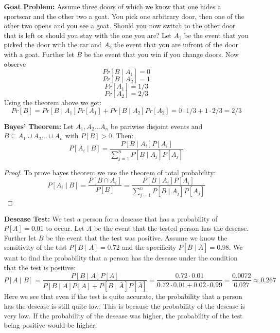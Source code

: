 \begin{example}
    \textbf{Goat Problem: } Assume three doors of which we know that one hides a sportscar and the other two a goat. You pick one arbitrary door, then one of the other two opens and you see a goat. Should you now switch to the other door that is left or should you stay with the one you are?
    Let $A_1$ be the event that you picked the door with the car and $A_2$ the event that you are infront of the door with a goat. Further let $B$ be the event that you win if you change doors. Now observe
    $$Pr[B \mid A_1] = 0$$
    $$Pr[B \mid A_2] = 1$$
    $$Pr[A_1] = 1/3$$
    $$Pr[A_2] = 2/3$$
    Using the theorem above we get:
    $$Pr[B] = Pr[B \mid A_1] Pr[A_1] + Pr[B \mid A_2] Pr[A_2] = 0 \cdot 1/3 + 1 \cdot 2/3 = 2/3$$
\end{example}

\begin{theorem}
    \textbf{Bayes' Theorem: } Let $A_1, A_2 ... A_n$ be pariwise disjoint events and $B \subseteq A_1 \cup A_2 ... \cup A_n$ with $P[B] > 0$. Then:
    $$P[A_i \mid B] = \frac{P[B \mid A_i] P[A_i]}{\sum_{j=1}^n P[B \mid A_j] P[A_j]}$$
\end{theorem}

\begin{proof}
    To prove bayes theorem we use the theorem of total probability:
    $$P[A_i \mid B] = \frac{P[B \cap A_i]}{P[B]} = \frac{P[B \mid A_i] P[A_i]}{\sum_{j=1}^n P[B \mid A_j] P[A_j]}$$
\end{proof}

    \begin{example}

\textbf{Desease Test: }We test a person for a desease that has a probability of $P[A] = 0.01$ to occur.
    Let $A$ be the event that the tested person has the desease. Further let $B$ be the event that the test
    was positive. Assume we know the sensitivity of the test $P[B \mid A] = 0.72$ and the specificity
    $P[\bar{B} \mid \bar{A}] = 0.98$. We want to find the probability that a person has the desease under
    the condition that the test is positive:
    $$P[A \mid B] = \frac{P[B \mid A] P[A]}{P[B \mid A] P[A] + P[B \mid
    \bar{A}] P[\bar{A}]} = \frac{0.72 \cdot 0.01}{0.72 \cdot 0.01 + 0.02 \cdot 0.99} = \frac{0.0072}{0.027}
    \approx 0.267$$
    Here we see that even if the test is quite accurate, the probability that a person has the desease
    is still quite low. This is because the probability of the desease is very low. If the probability of
    the desease was higher, the probability of the test being positive would be higher.
    
\end{example}

